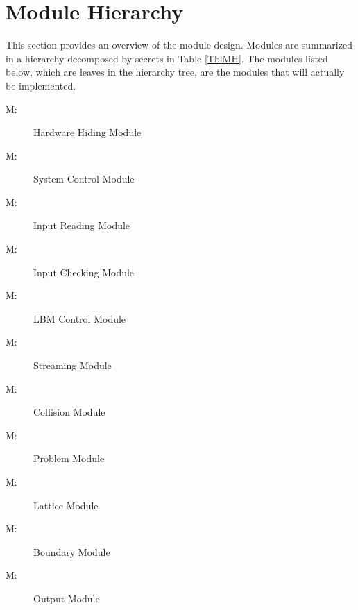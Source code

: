 \documentclass[12pt, titlepage]{article}
\newcounter{mnum}
\newcommand{\mthemnum}{M\themnum}
\begin{document}
\section{Module Hierarchy} \label{SecMH}

This section provides an overview of the module design. Modules are summarized
in a hierarchy decomposed by secrets in Table \ref{TblMH}. The modules listed
below, which are leaves in the hierarchy tree, are the modules that will
actually be implemented.

\begin{description}
\item [ \mthemnum \label{mHH}:] Hardware Hiding Module
\item [ \mthemnum \label{mSC}:] System Control Module
\item [ \mthemnum \label{mIR}:] Input Reading Module
\item [ \mthemnum \label{mIC}:] Input Checking Module
\item [ \mthemnum \label{mLC}:] LBM Control Module
\item [ \mthemnum \label{mST}:] Streaming Module
\item [ \mthemnum \label{mCO}:] Collision Module
\item [ \mthemnum \label{mPR}:] Problem Module
\item [ \mthemnum \label{mLA}:] Lattice Module
\item [ \mthemnum \label{mBO}:] Boundary Module
\item [ \mthemnum \label{mOU}:] Output Module
\end{description}
\end{document}
